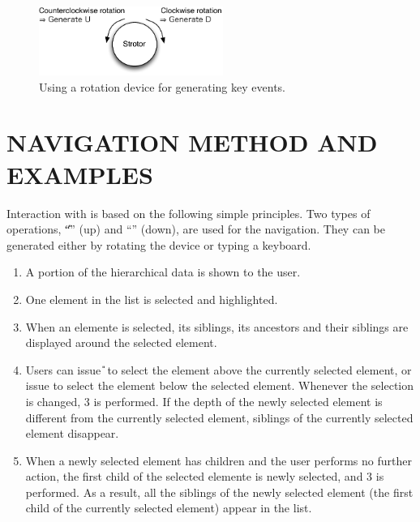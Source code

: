 \documentclass{article}
\begin{document}

\begin{figure}[H]
\centerline{\includegraphics[width=60mm,bb=0 0 294 110]{figures/rotation.pdf}}
\caption{Using a rotation device for generating key events.}
\label{rotation}
\end{figure}

\section*{NAVIGATION METHOD AND EXAMPLES}

Interaction with {\ST} is based on the following simple principles.
Two types of operations, ``{\U}'' (up) and ``{\D}'' (down), are used for the navigation.
They can be generated either by rotating the {\ST} device or typing a keyboard.

\begin{enumerate}
\item A portion of the hierarchical data is shown to the user.

\item One element in the list is selected and highlighted.


\item When an elemente is selected, its siblings, its ancestors and their siblings are displayed
around the selected element.

\item Users can issue {\U} to select the element above the currently selected element,
or issue {\D} to select the element below the selected element.
Whenever the selection is changed, 3 is performed.
If the depth of the newly selected element is different from the currently
selected element, siblings of the currently selected element disappear.

\item When a newly selected element has children and the user performs no further action,
the first child of the selected elemente is newly selected, and 3 is performed.
As a result, all the siblings of the newly selected element
(the first child of the currently selected element) appear in the list.

\end{enumerate}
\end{document}

